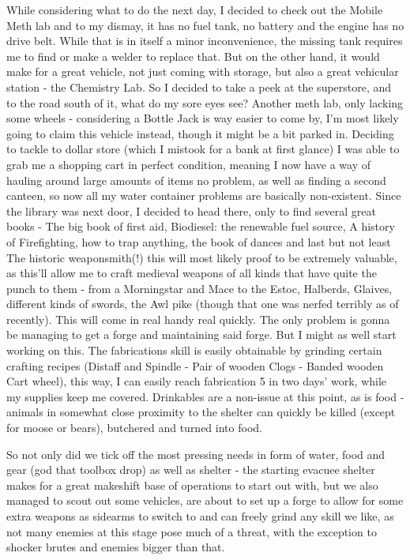 \documentclass[11pt]{report}
\begin{document}
While considering what to do the next day, I decided to check out the Mobile Meth lab and to my dismay, it has no fuel tank, no battery and the engine has no drive belt. While that is in itself a minor inconvenience, the missing tank requires me to find or make a welder to replace that. But on the other hand, it would make for a great vehicle, not just coming with storage, but also a great vehicular station - the Chemistry Lab. So I decided to take a peek at the superstore, and to the road south of it, what do my sore eyes see? Another meth lab, only lacking some wheels - considering a Bottle Jack is way easier to come by, I'm most likely going to claim this vehicle instead, though it might be a bit parked in. Deciding to tackle to dollar store (which I mistook for a bank at first glance) I was able to grab me a shopping cart in perfect condition, meaning I now have a way of hauling around large amounts of items no problem, as well as finding a second canteen, so now all my water container problems are basically non-existent. Since the library was next door, I decided to head there, only to find several great books - The big book of first aid, Biodiesel: the renewable fuel source, A history of Firefighting, how to trap anything, the book of dances and last but not least The historic weaponsmith(!) this will most likely proof to be extremely valuable, as this'll allow me to craft medieval weapons of all kinds that have quite the punch to them - from a Morningstar and Mace to the Estoc, Halberds, Glaives, different kinds of swords, the Awl pike (though that one was nerfed terribly as of recently). This will come in real handy real quickly. The only problem is gonna be managing to get a forge and maintaining said forge. But I might as well start working on this. The fabrications skill is easily obtainable by grinding certain crafting recipes (Distaff and Spindle - Pair of wooden Clogs - Banded wooden Cart wheel), this way, I can easily reach fabrication 5 in two days' work, while my supplies keep me covered. Drinkables are a non-issue at this point, as is food - animals in somewhat close proximity to the shelter can quickly be killed (except for moose or bears), butchered and turned into food.

So not only did we tick off the most pressing needs in form of water, food and gear (god that toolbox drop) as well as shelter - the starting evacuee shelter makes for a great makeshift base of operations to start out with, but we also managed to scout out some vehicles, are about to set up a forge to allow for some extra weapons as sidearms to switch to and can freely grind any skill we like, as not many enemies at this stage pose much of a threat, with the exception to shocker brutes and enemies bigger than that.
\end{document}
